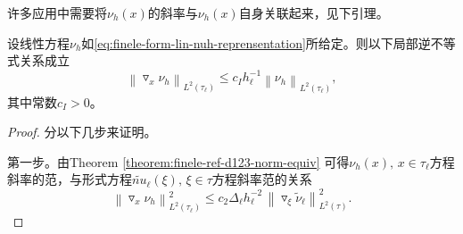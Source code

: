 许多应用中需要将$\nu_{h}(x)$的斜率与$\nu_{h}(x)$自身关联起来，见下引理。
\begin{lemma}[方程范数与方程斜率的范数]
  \label{lemma:finele-form-norm-gradient}
  设线性方程$\nu_{h}$如\eqref{eq:finele-form-lin-nuh-reprensentation}所给定。则以下局部逆不等式关系成立
  \begin{equation}
    \label{eq:finele-form-norm-gradient}
    \left\| \triangledown_{x} \nu_{h} \right\|_{L^{2}(\tau_{\ell})}
    \le c_{I} h_{\ell}^{-1} \left\| \nu_{h} \right\|_{L^{2}(\tau_{\ell})},
  \end{equation}
  其中常数$c_{I} > 0$。
\end{lemma}
\begin{proof}
  分以下几步来证明。

  第一步。由Theorem \ref{theorem:finele-ref-d123-norm-equiv} 可得$\nu_{h}(x), \, x \in \tau_{\ell}$方程斜率的范，与形式方程$\widetilde{nu}_{\ell} (\xi), \, \xi \in \tau$方程斜率范的关系
\begin{equation*}
  \left\| \triangledown_{x} \nu_{h} \right\|_{L^{2}(\tau_{\ell})}^{2}
  \le c_{2} \Delta_{\ell} h_{\ell}^{-2} \,
  \left\| \triangledown_{\xi} \widetilde{\nu}_{\ell}
  \right\|_{L^{2}(\tau)}^{2}.
\end{equation*}


\end{proof}
